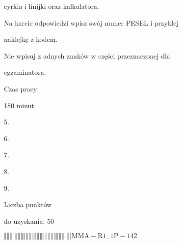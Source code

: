 \documentclass[a4paper,12pt]{article}
\begin{document}
cyrkla i linijki oraz kalkulatora.

Na karcie odpowiedzi wpisz swój numer PESEL i przyklej

naklejkę z kodem.

Nie wpisuj $\dot{\mathrm{z}}$ adnych znaków w części przeznaczonej dla

egzaminatora.

Czas pracy:

180 minut

5.

6.

7.

8.

9.

Liczba punktów

do uzyskania: 50

$\Vert\Vert\Vert\Vert\Vert\Vert\Vert\Vert\Vert\Vert\Vert\Vert\Vert\Vert\Vert\Vert\Vert\Vert\Vert\Vert\Vert\Vert\Vert\Vert|  \mathrm{M}\mathrm{M}\mathrm{A}-\mathrm{R}1_{-}1\mathrm{P}-142$
\end{document}
